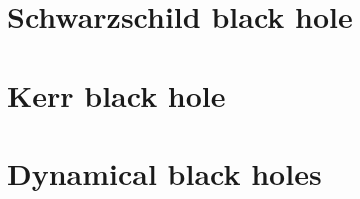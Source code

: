 \documentclass[12pt,a4paper]{book}
\begin{document}




\part{Schwarzschild black hole} \label{P:sch}





\part{Kerr black hole} \label{P:ker}





\part{Dynamical black holes}






\end{document}
